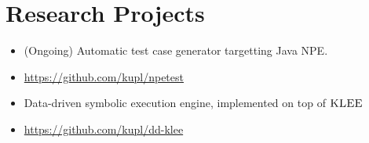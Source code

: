 
\section{Research Projects}

{
\begin{itemize}
\item (Ongoing) Automatic test case generator targetting Java NPE.
\item \url{https://github.com/kupl/npetest}
\end{itemize}
}

\vspace{2mm}


{
\begin{itemize}
\item Data-driven symbolic execution engine, implemented on top of $\textsc{KLEE}$
\item \url{https://github.com/kupl/dd-klee}
\end{itemize}
}

\vspace{8mm}